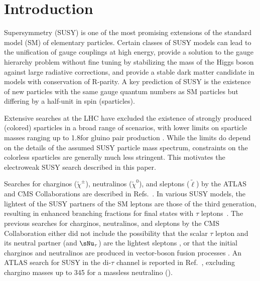 \section{Introduction}
\label{sect:introduction}

Supersymmetry (SUSY) \cite{Golfand:1971iw,Wess:1973kz,Wess:1974tw,Fayet1,Fayet2} is one of the most promising extensions of the 
standard model (SM) of elementary particles.  
Certain classes of SUSY models can lead to the unification of gauge couplings at high energy, 
provide a solution to the gauge hierarchy problem without fine tuning by stabilizing the mass of the Higgs boson 
against large radiative corrections, and provide a stable dark matter candidate in models with conservation of R-parity.
A key prediction of SUSY is the existence of new particles with the same gauge quantum numbers as SM particles but
differing by a half-unit in spin (sparticles).


Extensive searches at the LHC have excluded the existence of strongly produced (colored) sparticles in a broad range of scenarios, 
with lower limits on sparticle masses ranging up to 1.8\TeV for gluino pair production 
\cite{Chatrchyan:2013fea,Chatrchyan:2013mys,Chatrchyan:2014aea,Chatrchyan:2014lfa,Khachatryan:2015vra,Khachatryan:2015lwa,Aad:2015pfx,Aad:2015iea}. 
While the limits do depend on the details of the assumed SUSY particle mass spectrum, 
constraints on the colorless sparticles are generally much less stringent.
This motivates the electroweak SUSY search described in this paper.


Searches for charginos ($\widetilde{\chi}^{\pm}\xspace$), neutralinos ($\widetilde{\chi}^{0}\xspace$), and sleptons ($\widetilde{\ell}\xspace$) by the ATLAS and CMS Collaborations are described in Refs.~\cite{Aad:2014nua,Aad:2014vma,Khachatryan:2014qwa,Khachatryan:2014mma,Khachatryan:2015kxa}.
In various SUSY models, the lightest of the SUSY partners of the SM leptons are those of the third generation, 
resulting in enhanced branching fractions for final states with $\tau$ leptons~\cite{Martin:1997ns}.  
The previous searches for charginos, neutralinos, and sleptons by the CMS Collaboration  either did not include the possibility that 
the scalar $\tau$ lepton and its neutral partner (\stau and $\sNu_\tau$) 
are the lightest sleptons \cite{Khachatryan:2014qwa}, or that the initial charginos and neutralinos are produced in vector-boson fusion processes \cite{Khachatryan:2015kxa}. An ATLAS search for SUSY in the di-$\tau$ channel is reported in Ref.~\cite{Aad:2014yka}, excluding chargino masses up to 345\GeV 
for a massless neutralino (\PSGczDo).

